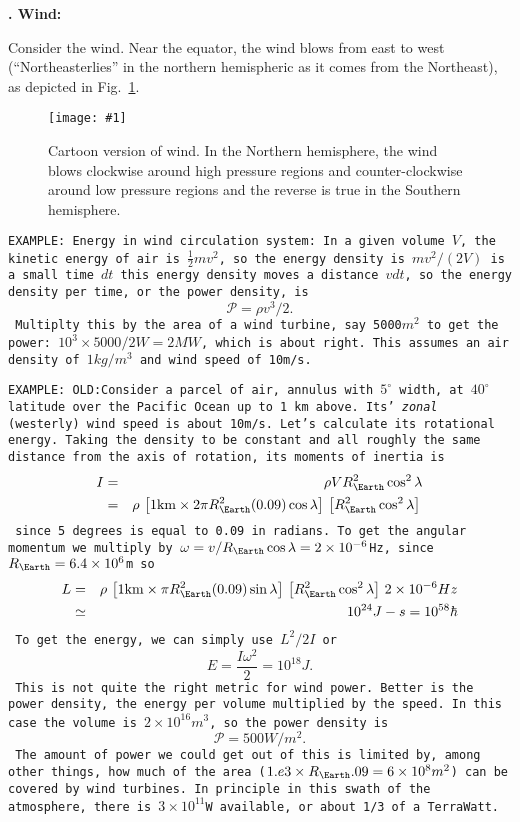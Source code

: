 \documentclass[11pt]{book}
\def\be{\begin{equation}}
\def\ee{\end{equation}}
\def\bea{\begin{eqnarray}}
\def\eea{\end{eqnarray}}
\newcommand{\vs}{\nonumber\\}
\newcommand{\sfig}[2]{
\texttt{[image: \#1]}
        }
\newcommand{\Sjpg}[2]{
   \begin{figure}[thbp]
   \begin{center}
    \sfig{../Figures/#1.jpg}{0.6\columnwidth}
    \caption{{\small #2}}
    \label{fig:#1}
     \end{center}
   \end{figure}
}
\newcommand{\rf}[1]{\ref{fig:#1}}
\newcommand\example[1]{{\tt EXAMPLE: #1}}
\newcommand\lecture[1]{\newpage
\addtocounter{lectureno}{1}
\setcounter{secno}{0}
\begin{center}
 {\bf Lecture \arabic{lectureno}: #1}
\end{center}
}
\newcounter{lectureno}
\newcounter{secno}
\newcommand\lsection[1]{
\addtocounter{secno}{1}
{\bf \arabic{lectureno}.\alph{secno} #1:}}
\begin{document}
\lsection{Wind}

Consider the wind. Near the equator, the wind blows from east to west (``Northeasterlies'' in the northern hemispheric as it comes from the Northeast), as depicted in Fig.~\rf{winds}.
\Sjpg{winds}{Cartoon version of wind. In the Northern hemisphere, the wind blows clockwise around high pressure regions and counter-clockwise around low pressure regions and the reverse is true in the Southern hemisphere.}

\example{Energy in wind circulation system: 
In a given volume $V$, the kinetic energy of air is $\frac12mv^2$, so the energy density is $mv^2/(2V)$ is a small time $dt$ this energy density moves a distance $vdt$, so the energy density per time, or the power density, is
\be
\mathcal{P} =\rho v^3/2.\ee
Multiplty this by the area of a wind turbine, say 5000$m^2$ to get the power: $10^3\times 5000/2 W = 2MW$, which is about right. This assumes an air density of $1kg/m^3$ and wind speed of 10m/s.}


\example{OLD:Consider a parcel of air, annulus with $5^\circ$ width, at $40^\circ$ latitude over the Pacific Ocean up to 1 km above. Its' {\it zonal} (westerly) wind speed is about 10m/s. Let's calculate its rotational energy. Taking the density to be constant and all roughly the same distance from the axis of rotation, its moments of inertia is
\bea
I &=& \rho V R_\Earth^2\cos^2\lambda\vs
&=&\rho \, \left[ 1{\rm km}\times 2\pi R_\Earth^2 (0.09)\cos\lambda \right]\,\left[ R_\Earth^2\cos^2\lambda\right]\,
 \eea
since 5 degrees is equal to 0.09 in radians. To get the angular momentum we multiply by $\omega=v/R_\Earth\cos\lambda=2\times 10^{-6}$Hz, since $R_\Earth=6.4\times 10^6$m so
\bea
L&=&\rho \, \left[ 1{\rm km}\times \pi R_\Earth^2 (0.09)\sin\lambda \right]\,\left[ R_\Earth^2\cos^2\lambda\right]\,2\times 10^{-6}Hz\vs
&\simeq& 10^{24} J-s = 10^{58}\hbar
\eea
To get the energy, we can simply use $L^2/2I$ or
\be
E = \frac{I\omega^2}{2} = 10^{18}J.\ee
This is not quite the right metric for wind power. Better is the power density, the energy per volume multiplied by the speed. In this case the volume is $2\times10^{16}m^3$, so the power density is
\be
\mathcal{P} = 500 W/m^2
.\ee
The amount of power we could get out of this is limited by, among other things, how much of the area ($1.e3\times R_\Earth\time0.09=6\times 10^8m^2$) can be covered by wind turbines. In principle in this swath of the atmosphere, there is $3\times 10^{11}$W available, or about 1/3 of a TerraWatt.
}

\end{document}
